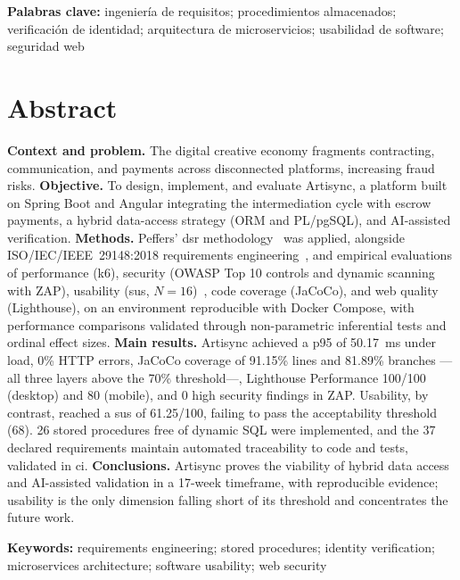 \textbf{Palabras clave:} ingeniería de requisitos; procedimientos
almacenados; verificación de identidad; arquitectura de microservicios;
usabilidad de software; seguridad web

\chapter*{Abstract}

\textbf{Context and problem.} The digital creative economy fragments contracting, communication, and payments across disconnected platforms, increasing fraud risks. \textbf{Objective.} To design, implement, and evaluate Artisync, a platform built on Spring Boot and Angular integrating the intermediation cycle with escrow payments, a hybrid data-access strategy (ORM and PL/pgSQL), and AI-assisted verification. \textbf{Methods.} Peffers' \gls{dsr} methodology~\cite{PEFFERS2007} was applied, alongside ISO/IEC/IEEE~29148:2018 requirements engineering~\cite{ISO29148}, and empirical evaluations of performance (k6), security (OWASP Top 10 controls and dynamic scanning with ZAP), usability (\gls{sus}, $N=16$)~\cite{BROOKE1996,BANGOR2009}, code coverage (JaCoCo), and web quality (Lighthouse), on an environment reproducible with Docker Compose, with performance comparisons validated through non-parametric inferential tests and ordinal effect sizes. \textbf{Main results.} Artisync achieved a p95 of 50.17~ms under load, 0\% HTTP errors, JaCoCo coverage of 91.15\% lines and 81.89\% branches ---all three layers above the 70\% threshold---, Lighthouse Performance 100/100 (desktop) and 80 (mobile), and 0 high security findings in ZAP. Usability, by contrast, reached a \gls{sus} of 61.25/100, failing to pass the acceptability threshold (68). 26 stored procedures free of dynamic SQL were implemented, and the 37 declared requirements maintain automated traceability to code and tests, validated in \gls{ci}. \textbf{Conclusions.} Artisync proves the viability of hybrid data access and AI-assisted validation in a 17-week timeframe, with reproducible evidence; usability is the only dimension falling short of its threshold and concentrates the future work.

\textbf{Keywords:} requirements engineering; stored procedures; identity
verification; microservices architecture; software usability; web
security
